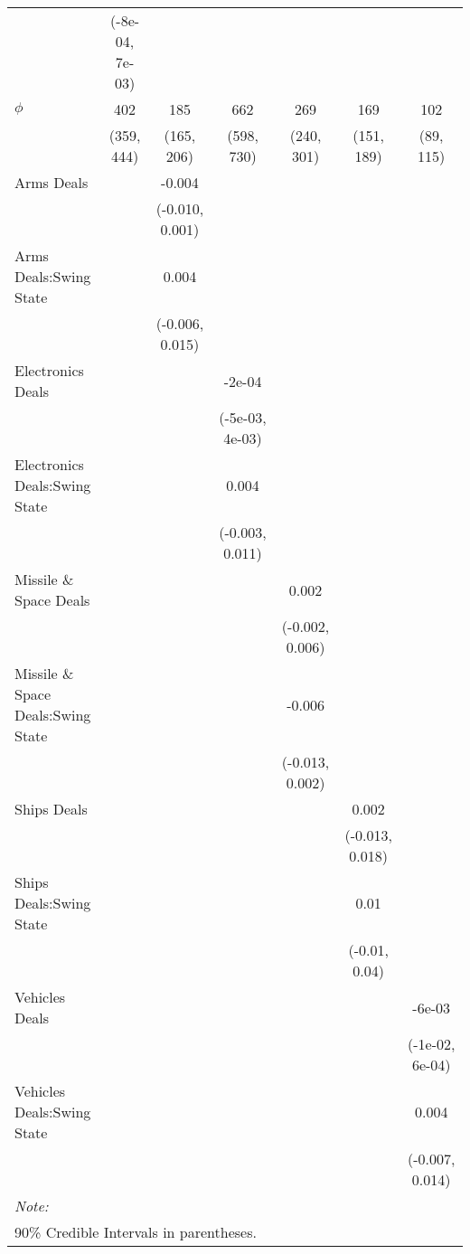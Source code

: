 \begin{table}[H]
{\begin{tabular}[t]{lcccccc}
 & (-8e-04, 7e-03) &  &  &  &  & \\
$\phi$ & 402 & 185 & 662 & 269 & 169 & 102\\
 & (359, 444) & (165, 206) & (598, 730) & (240, 301) & (151, 189) & (89, 115)\\
Arms Deals &  & -0.004 &  &  &  & \\
 &  & (-0.010, 0.001) &  &  &  & \\
Arms Deals:Swing State &  & 0.004 &  &  &  & \\
 &  & (-0.006, 0.015) &  &  &  & \\
Electronics Deals &  &  & -2e-04 &  &  & \\
 &  &  & (-5e-03, 4e-03) &  &  & \\
Electronics Deals:Swing State &  &  & 0.004 &  &  & \\
 &  &  & (-0.003, 0.011) &  &  & \\
Missile \& Space Deals &  &  &  & 0.002 &  & \\
 &  &  &  & (-0.002, 0.006) &  & \\
Missile \& Space Deals:Swing State &  &  &  & -0.006 &  & \\
 &  &  &  & (-0.013, 0.002) &  & \\
Ships Deals &  &  &  &  & 0.002 & \\
 &  &  &  &  & (-0.013, 0.018) & \\
Ships Deals:Swing State &  &  &  &  & 0.01 & \\
 &  &  &  &  & (-0.01, 0.04) & \\
Vehicles Deals &  &  &  &  &  & -6e-03\\
 &  &  &  &  &  & (-1e-02, 6e-04)\\
Vehicles Deals:Swing State &  &  &  &  &  & 0.004\\
 &  &  &  &  &  & (-0.007, 0.014)\\
\bottomrule
\multicolumn{7}{l}{\rule{0pt}{1em}\textit{Note: }}\\
\multicolumn{7}{l}{\rule{0pt}{1em}90\% Credible Intervals in parentheses.}\\
\end{tabular}}
\end{table}
